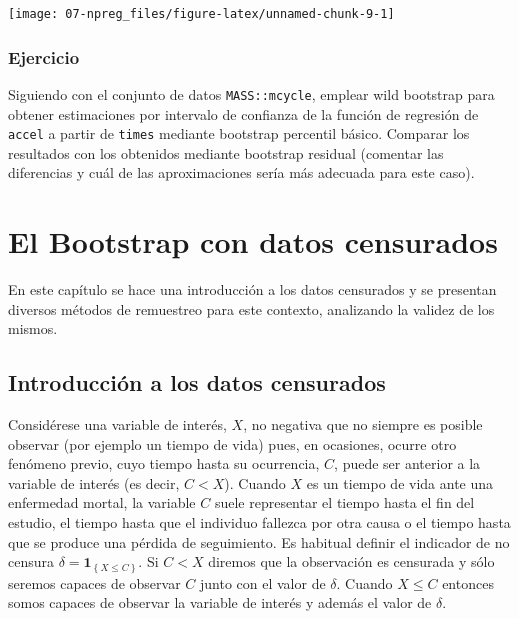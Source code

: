 \documentclass[
]{book}
\theoremstyle{break}
\theoremstyle{definition}
\theoremstyle{definition}
\theoremstyle{definition}
\theoremstyle{remark}
\begin{document}
\begin{center}\texttt{[image: 07-npreg\_files/figure-latex/unnamed-chunk-9-1]} \end{center}

\hypertarget{ejercicio-1}{%
\subsection{Ejercicio}\label{ejercicio-1}}

Siguiendo con el conjunto de datos \texttt{MASS::mcycle}, emplear wild bootstrap para
obtener estimaciones por intervalo de confianza de la función de regresión
de \texttt{accel} a partir de \texttt{times} mediante bootstrap percentil básico.
Comparar los resultados con los obtenidos mediante bootstrap residual (comentar las diferencias y cuál de las aproximaciones sería más adecuada para este caso).

\hypertarget{bootcen}{%
\chapter{El Bootstrap con datos censurados}\label{bootcen}}

En este capítulo se hace una introducción a los datos censurados y se
presentan diversos métodos de remuestreo para este contexto, analizando
la validez de los mismos.

\hypertarget{introducciuxf3n-a-los-datos-censurados}{%
\section{Introducción a los datos censurados}\label{introducciuxf3n-a-los-datos-censurados}}

Considérese una variable de interés, \(X\), no negativa que no siempre es
posible observar (por ejemplo un tiempo de vida) pues, en ocasiones,
ocurre otro fenómeno previo, cuyo tiempo hasta su ocurrencia, \(C\), puede
ser anterior a la variable de interés (es decir, \(C<X\)). Cuando \(X\) es
un tiempo de vida ante una enfermedad mortal, la variable \(C\) suele
representar el tiempo hasta el fin del estudio, el tiempo hasta que el
individuo fallezca por otra causa o el tiempo hasta que se produce una
pérdida de seguimiento. Es habitual definir el indicador de no censura
\(\delta =\mathbf{1}_{\left\{ X\leq C\right\} }\). Si \(C<X\) diremos que la
observación es censurada y sólo seremos capaces de observar \(C\) junto
con el valor de \(\delta\). Cuando \(X\leq C\) entonces somos capaces de
observar la variable de interés y además el valor de \(\delta\).
\end{document}
